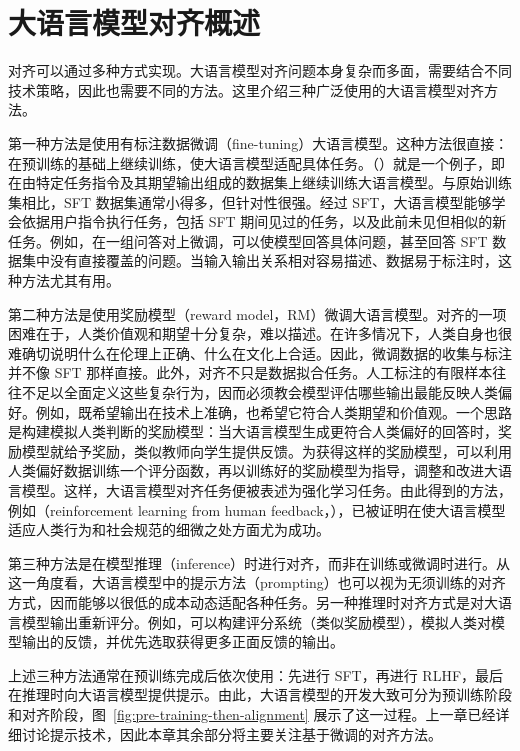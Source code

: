 
\section{大语言模型对齐概述}

\noindent 对齐可以通过多种方式实现。大语言模型对齐问题本身复杂而多面，需要结合不同技术策略，因此也需要不同的方法。这里介绍三种广泛使用的大语言模型对齐方法。

第一种方法是使用有标注数据微调（fine-tuning）大语言模型。这种方法很直接：在预训练的基础上继续训练，使大语言模型适配具体任务。（）就是一个例子，即在由特定任务指令及其期望输出组成的数据集上继续训练大语言模型。与原始训练集相比，SFT 数据集通常小得多，但针对性很强。经过 SFT，大语言模型能够学会依据用户指令执行任务，包括 SFT 期间见过的任务，以及此前未见但相似的新任务。例如，在一组问答对上微调，可以使模型回答具体问题，甚至回答 SFT 数据集中没有直接覆盖的问题。当输入输出关系相对容易描述、数据易于标注时，这种方法尤其有用。

第二种方法是使用奖励模型（reward model，RM）微调大语言模型。对齐的一项困难在于，人类价值观和期望十分复杂，难以描述。在许多情况下，人类自身也很难确切说明什么在伦理上正确、什么在文化上合适。因此，微调数据的收集与标注并不像 SFT 那样直接。此外，对齐不只是数据拟合任务。人工标注的有限样本往往不足以全面定义这些复杂行为，因而必须教会模型评估哪些输出最能反映人类偏好。例如，既希望输出在技术上准确，也希望它符合人类期望和价值观。一个思路是构建模拟人类判断的奖励模型：当大语言模型生成更符合人类偏好的回答时，奖励模型就给予奖励，类似教师向学生提供反馈。为获得这样的奖励模型，可以利用人类偏好数据训练一个评分函数，再以训练好的奖励模型为指导，调整和改进大语言模型。这样，大语言模型对齐任务便被表述为强化学习任务。由此得到的方法，例如（reinforcement learning from human feedback，），已被证明在使大语言模型适应人类行为和社会规范的细微之处方面尤为成功。

第三种方法是在模型推理（inference）时进行对齐，而非在训练或微调时进行。从这一角度看，大语言模型中的提示方法（prompting）也可以视为无须训练的对齐方式，因而能够以很低的成本动态适配各种任务。另一种推理时对齐方式是对大语言模型输出重新评分。例如，可以构建评分系统（类似奖励模型），模拟人类对模型输出的反馈，并优先选取获得更多正面反馈的输出。

上述三种方法通常在预训练完成后依次使用：先进行 SFT，再进行 RLHF，最后在推理时向大语言模型提供提示。由此，大语言模型的开发大致可分为预训练阶段和对齐阶段，图~\ref{fig:pre-training-then-alignment} 展示了这一过程。上一章已经详细讨论提示技术，因此本章其余部分将主要关注基于微调的对齐方法。

